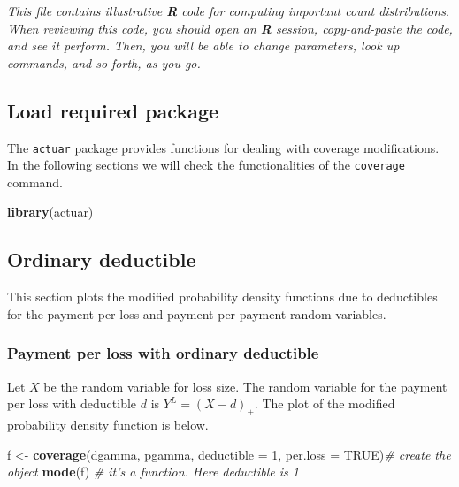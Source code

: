\documentclass[]{book}
\newenvironment{Shaded}{\begin{snugshade}}{\end{snugshade}}
\newcommand{\KeywordTok}[1]{\textcolor[rgb]{0.13,0.29,0.53}{\textbf{#1}}}
\newcommand{\DataTypeTok}[1]{\textcolor[rgb]{0.13,0.29,0.53}{#1}}
\newcommand{\DecValTok}[1]{\textcolor[rgb]{0.00,0.00,0.81}{#1}}
\newcommand{\StringTok}[1]{\textcolor[rgb]{0.31,0.60,0.02}{#1}}
\newcommand{\CommentTok}[1]{\textcolor[rgb]{0.56,0.35,0.01}{\textit{#1}}}
\newcommand{\OtherTok}[1]{\textcolor[rgb]{0.56,0.35,0.01}{#1}}
\newcommand{\NormalTok}[1]{#1}
\theoremstyle{definition}
\theoremstyle{definition}
\theoremstyle{definition}
\theoremstyle{remark}
\begin{document}
\emph{This file contains illustrative \textbf{R} code for computing
important count distributions. When reviewing this code, you should open
an \textbf{R} session, copy-and-paste the code, and see it perform.
Then, you will be able to change parameters, look up commands, and so
forth, as you go. }

\subsection{Load required package}\label{load-required-package}

The \texttt{actuar} package provides functions for dealing with coverage
modifications. In the following sections we will check the
functionalities of the \texttt{coverage} command.

\begin{Shaded}
\begin{Highlighting}[]
\KeywordTok{library}\NormalTok{(actuar)}
\end{Highlighting}
\end{Shaded}

\subsection{Ordinary deductible}\label{ordinary-deductible}

This section plots the modified probability density functions due to
deductibles for the payment per loss and payment per payment random
variables.

\subsubsection{Payment per loss with ordinary
deductible}\label{payment-per-loss-with-ordinary-deductible}

Let \(X\) be the random variable for loss size. The random variable for
the payment per loss with deductible \(d\) is \(Y^L=(X-d)_+\). The plot
of the modified probability density function is below.

\begin{Shaded}
\begin{Highlighting}[]
\NormalTok{f <-}\StringTok{ }\KeywordTok{coverage}\NormalTok{(dgamma, pgamma, }\DataTypeTok{deductible =} \DecValTok{1}\NormalTok{, }\DataTypeTok{per.loss =} \OtherTok{TRUE}\NormalTok{)}\CommentTok{# create the object}
\KeywordTok{mode}\NormalTok{(f) }\CommentTok{# it's a function. Here deductible is 1}
\end{Highlighting}
\end{Shaded}
\end{document}
